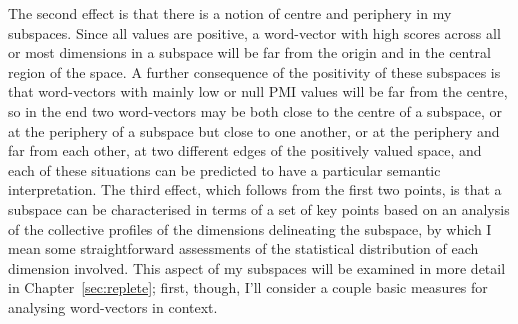 The second effect is that there is a notion of centre and periphery in my subspaces.  Since all values are positive, a word-vector with high scores across all or most dimensions in a subspace will be far from the origin and in the central region of the space.  A further consequence of the positivity of these subspaces is that word-vectors with mainly low or null PMI values will be far from the centre, so in the end two word-vectors may be both close to the centre of a subspace, or at the periphery of a subspace but close to one another, or at the periphery and far from each other, at two different edges of the positively valued space, and each of these situations can be predicted to have a particular semantic interpretation.  The third effect, which follows from the first two points, is that a subspace can be characterised in terms of a set of key points based on an analysis of the collective profiles of the dimensions delineating the subspace, by which I mean some straightforward assessments of the statistical distribution of each dimension involved.  This aspect of my subspaces will be examined in more detail in Chapter~\ref{sec:replete}; first, though, I'll consider a couple basic measures for analysing word-vectors in context.

